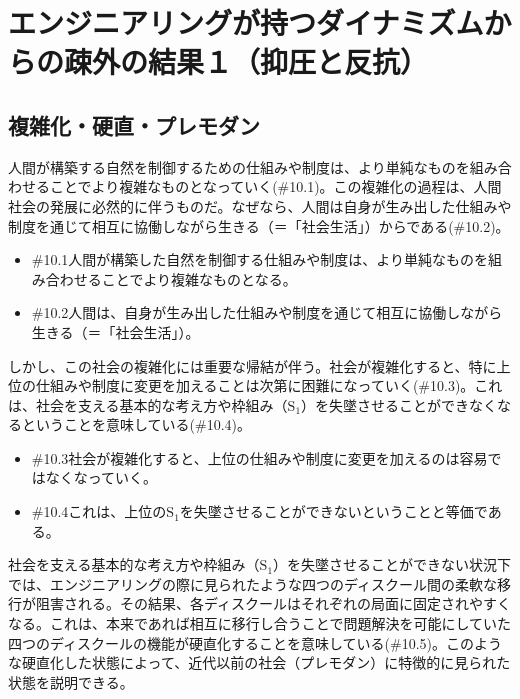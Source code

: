 \section{エンジニアリングが持つダイナミズムからの疎外の結果１（抑圧と反抗）}\label{ux30a8ux30f3ux30b8ux30cbux30a2ux30eaux30f3ux30b0ux304cux6301ux3064ux30c0ux30a4ux30caux30dfux30baux30e0ux304bux3089ux306eux758eux5916ux306eux7d50ux679cuxff11ux6291ux5727ux3068ux53cdux6297}

\subsection{複雑化・硬直・プレモダン}\label{ux8907ux96d1ux5316ux786cux76f4ux30d7ux30ecux30e2ux30c0ux30f3}

人間が構築する自然を制御するための仕組みや制度は、より単純なものを組み合わせることでより複雑なものとなっていく(\#10.1)。この複雑化の過程は、人間社会の発展に必然的に伴うものだ。なぜなら、人間は自身が生み出した仕組みや制度を通じて相互に協働しながら生きる（＝「社会生活」）からである(\#10.2)。

\begin{note}{}
  \begin{itemize}
    \tightlist
    \item{\#10.1}人間が構築した自然を制御する仕組みや制度は、より単純なものを組み合わせることでより複雑なものとなる。
    \item{\#10.2}人間は、自身が生み出した仕組みや制度を通じて相互に協働しながら生きる（＝「社会生活」）。
  \end{itemize}
\end{note}

しかし、この社会の複雑化には重要な帰結が伴う。社会が複雑化すると、特に上位の仕組みや制度に変更を加えることは次第に困難になっていく(\#10.3)。これは、社会を支える基本的な考え方や枠組み（\(\textrm{S}_1\)）を失墜させることができなくなるということを意味している(\#10.4)。

\begin{note}{}
  \begin{itemize}
    \tightlist
    \item{\#10.3}社会が複雑化すると、上位の仕組みや制度に変更を加えるのは容易ではなくなっていく。
    \item{\#10.4}これは、上位の$\textrm{S}_1$を失墜させることができないということと等価である。
  \end{itemize}
\end{note}

社会を支える基本的な考え方や枠組み（\(\textrm{S}_1\)）を失墜させることができない状況下では、エンジニアリングの際に見られたような四つのディスクール間の柔軟な移行が阻害される。その結果、各ディスクールはそれぞれの局面に固定されやすくなる。これは、本来であれば相互に移行し合うことで問題解決を可能にしていた四つのディスクールの機能が硬直化することを意味している(\#10.5)。このような硬直化した状態によって、近代以前の社会（プレモダン）に特徴的に見られた状態を説明できる。

